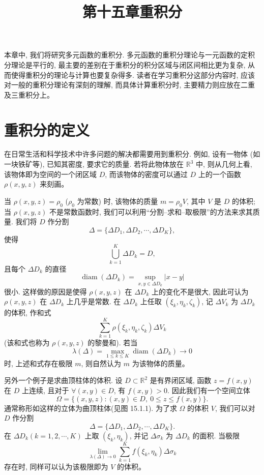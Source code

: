 \documentclass[UTF8,12pt,a4paper,fontset=fandol]{ctexart}
\title{第十五章\quad 重积分}
\author{}
\date{}
\begin{document}
\maketitle

本章中, 我们将研究多元函数的重积分. 多元函数的重积分理论与一元函数的定积分理论是平行的, 最主要的差别在于重积分的积分区域与闭区间相比更为复杂, 从而使得重积分的理论与计算也要复杂得多. 读者在学习重积分这部分内容时, 应该对一般的重积分理论有深刻的理解, 而具体计算重积分时, 主要精力则应放在二重及三重积分上。

\section{重积分的定义}

在日常生活和科学技术中许多问题的解决都需要用到重积分. 例如, 设有一物体 (如一块铁矿等), 已知其密度, 要求它的质量. 若将此物体放在 $\mathbb R^3$ 中, 则从几何上看, 该物体即为空间的一个闭区域 $D$, 而该物体的密度可以通过 $D$ 上的一个函数 $\rho(x,y,z)$ 来刻画。

当 $\rho(x,y,z)=\rho_0$ ($\rho_0$ 为常数) 时, 该物体的质量 $m=\rho_0V$, 其中 $V$ 是 $D$ 的体积; 当 $\rho(x,y,z)$ 不是常数函数时, 我们可以利用“分割--求和--取极限”的方法来求其质量. 我们将 $D$ 作分割
\[
  \Delta=\{\Delta D_1,\Delta D_2,\cdots,\Delta D_K\},
\]
使得
\[
  \bigcup_{k=1}^K\Delta D_k=D,
\]
且每个 $\Delta D_k$ 的直径
\[
  \operatorname{diam}(\Delta D_k)=\sup_{x,y\in\Delta D_k}|x-y|
\]
很小. 这样做的原因是使得 $\rho(x,y,z)$ 在 $\Delta D_k$ 上的变化不是很大, 因此可认为 $\rho(x,y,z)$ 在 $\Delta D_k$ 上几乎是常数. 在 $\Delta D_k$ 上任取 $(\xi_k,\eta_k,\zeta_k)$, 记 $\Delta V_k$ 为 $\Delta D_k$ 的体积, 作和式
\[
  \sum_{k=1}^K\rho(\xi_k,\eta_k,\zeta_k)\Delta V_k
\]
(该和式也称为 $\rho(x,y,z)$ 的黎曼和). 若当
\[
  \lambda(\Delta)=\max_{1\leqslant k\leqslant K}\operatorname{diam}(\Delta D_k)\to0
\]
时, 上述和式存在极限 $m$, 则自然认为 $m$ 为该物体的质量。

另外一个例子是求曲顶柱体的体积. 设 $D\subset\mathbb R^2$ 是有界闭区域, 函数 $z=f(x,y)$ 在 $D$ 上连续, 且对于 $\forall(x,y)\in D$, 有 $f(x,y)>0$. 因此我们有一个空间立体
\[
  \Omega=\{(x,y,z):(x,y)\in D,\ 0\leqslant z\leqslant f(x,y)\}.
\]
通常称形如这样的立体为曲顶柱体(见图 15.1.1). 为了求 $\Omega$ 的体积 $V$, 我们可以对 $D$ 作分割
\[
  \Delta=\{\Delta D_1,\Delta D_2,\cdots,\Delta D_K\}.
\]
在 $\Delta D_k(k=1,2,\cdots,K)$ 上取 $(\xi_k,\eta_k)$, 并记 $\Delta\sigma_k$ 为 $\Delta D_k$ 的面积. 当极限
\[
  \lim_{\lambda(\Delta)\to0}\sum_{k=1}^K f(\xi_k,\eta_k)\Delta\sigma_k
\]
存在时, 同样可以认为该极限即为 $V$ 的体积。
\end{document}
